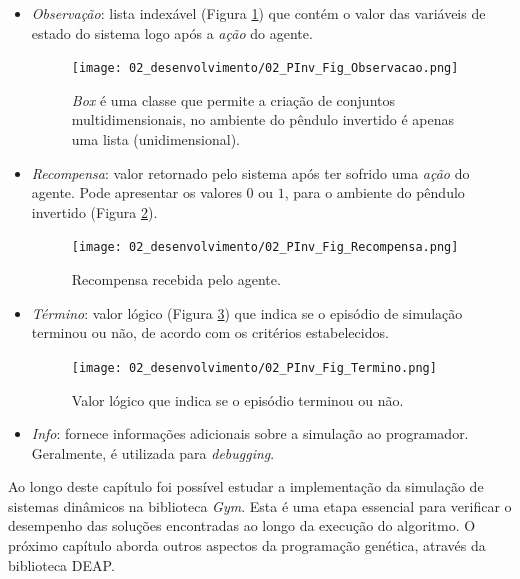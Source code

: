 \begin{itemize}[label=\raisebox{0.25ex}{\tiny$\bullet$}]
\item \textit{Observação}: lista indexável (Figura \ref{fig:2gym-observacao}) que contém o valor das variáveis de estado do sistema logo após a \textit{ação} do agente.
\begin{figure}[H]
\centering
\texttt{[image: 02\_desenvolvimento/02\_PInv\_Fig\_Observacao.png]}
\caption{\textit{Box} é uma classe que permite a criação de conjuntos multidimensionais, no ambiente do pêndulo invertido é apenas uma lista (unidimensional).}\label{fig:2gym-observacao}
\end{figure}
\item \textit{Recompensa}: valor retornado pelo sistema após ter sofrido uma \textit{ação} do agente. Pode apresentar os valores $0$ ou $1$, para o ambiente do pêndulo invertido (Figura \ref{fig:2gym-recompensa}).
\begin{figure}[!h]
\centering
\texttt{[image: 02\_desenvolvimento/02\_PInv\_Fig\_Recompensa.png]}
\caption{Recompensa recebida pelo agente.}\label{fig:2gym-recompensa}
\end{figure}
\item \textit{Término}: valor lógico (Figura \ref{fig:2gym-termino}) que indica se o episódio de simulação terminou ou não, de acordo com os critérios estabelecidos.
\begin{figure}[!h]
\centering
\texttt{[image: 02\_desenvolvimento/02\_PInv\_Fig\_Termino.png]}
\caption{Valor lógico que indica se o episódio terminou ou não.}\label{fig:2gym-termino}
\end{figure}
\item \textit{Info}: fornece informações adicionais sobre a simulação ao programador. Geralmente, é utilizada para \textit{debugging}.
\end{itemize}

Ao longo deste capítulo foi possível estudar a implementação da simulação de sistemas dinâmicos na biblioteca \textit{Gym}. Esta é uma etapa essencial para verificar o desempenho das soluções encontradas ao longo da execução do algoritmo. O próximo capítulo aborda outros aspectos da programação genética, através da biblioteca DEAP.